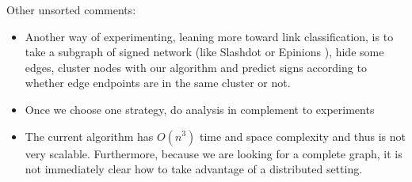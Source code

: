 Other unsorted comments:
\begin{itemize}
	\item Another way of experimenting, leaning more toward link classification,
		is to take a subgraph of signed network (like Slashdot or Epinions
		\autocite{Leskovec2010}), hide some edges, cluster nodes with our
		algorithm and predict signs according to whether edge endpoints are in
		the same cluster or not.
	\item Once we choose one strategy, do analysis in complement to
		experiments
	\item The current algorithm has $O(n^3)$ time and space complexity and
		thus is not very scalable. Furthermore, because we are looking for a
		complete graph, it is not immediately clear how to take advantage of a
		distributed setting.
\end{itemize}

